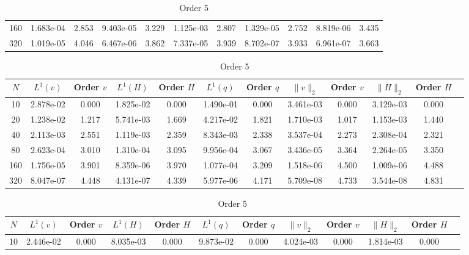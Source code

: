 \documentclass[english]{article}
\theoremstyle{thmstyleone}
\theoremstyle{thmstyletwo}
\theoremstyle{thmstylethree}
\begin{document}
\begin{table}[ht]
\begin{adjustbox}{width=1\textwidth}
\begin{subtable}{1.\linewidth}
\begin{tabular}{ccccccccccc}
				160 & 1.683e-04 & 2.853 & 9.403e-05 & 3.229 & 1.125e-03 & 2.807 & 1.329e-05 & 2.752 & 8.819e-06 & 3.435 \\
				320 & 1.019e-05 & 4.046 & 6.467e-06 & 3.862 & 7.337e-05 & 3.939 & 8.702e-07 & 3.933 & 6.961e-07 & 3.663 \\
				\bottomrule
			\end{tabular}
		\end{subtable}
	\end{adjustbox}
	\begin{adjustbox}{width=1\textwidth}
	\small
		\begin{subtable}{1.\linewidth}
			\centering
			\caption{Order 4}
			\begin{tabular}{cccccccccccc}
				\toprule
				$N$ & $L^1(v)$ & Order $v$ & $L^1(H)$ & Order $H$ & $L^1(q)$ & Order $q$ & $\|v\|_2$ & Order $v$ & $\|H\|_2$ & Order $H$ \\
				\midrule
				10 & 2.878e-02 & 0.000 & 1.825e-02 & 0.000 & 1.490e-01 & 0.000 & 3.461e-03 & 0.000 & 3.129e-03 & 0.000 \\
				20 & 1.238e-02 & 1.217 & 5.741e-03 & 1.669 & 4.217e-02 & 1.821 & 1.710e-03 & 1.017 & 1.153e-03 & 1.440 \\
				40 & 2.113e-03 & 2.551 & 1.119e-03 & 2.359 & 8.343e-03 & 2.338 & 3.537e-04 & 2.273 & 2.308e-04 & 2.321 \\
				80 & 2.623e-04 & 3.010 & 1.310e-04 & 3.095 & 9.956e-04 & 3.067 & 3.436e-05 & 3.364 & 2.264e-05 & 3.350 \\
				160 & 1.756e-05 & 3.901 & 8.359e-06 & 3.970 & 1.077e-04 & 3.209 & 1.518e-06 & 4.500 & 1.009e-06 & 4.488 \\
				320 & 8.047e-07 & 4.448 & 4.131e-07 & 4.339 & 5.977e-06 & 4.171 & 5.709e-08 & 4.733 & 3.544e-08 & 4.831 \\
				\bottomrule
			\end{tabular}
		\end{subtable}
	\end{adjustbox}
	\begin{adjustbox}{width=1\textwidth}
	\small
		\begin{subtable}{1.\linewidth}
			\centering
			\caption{Order 5}
			\begin{tabular}{cccccccccccc}
				\toprule
				$N$ & $L^1(v)$ & Order $v$ & $L^1(H)$ & Order $H$ & $L^1(q)$ & Order $q$ & $\|v\|_2$ & Order $v$ & $\|H\|_2$ & Order $H$ \\
				\midrule
				10 & 2.446e-02 & 0.000 & 8.035e-03 & 0.000 & 9.873e-02 & 0.000 & 4.024e-03 & 0.000 & 1.814e-03 & 0.000 \\

\end{tabular}
\end{subtable}
\end{adjustbox}
\end{table}
\end{document}
